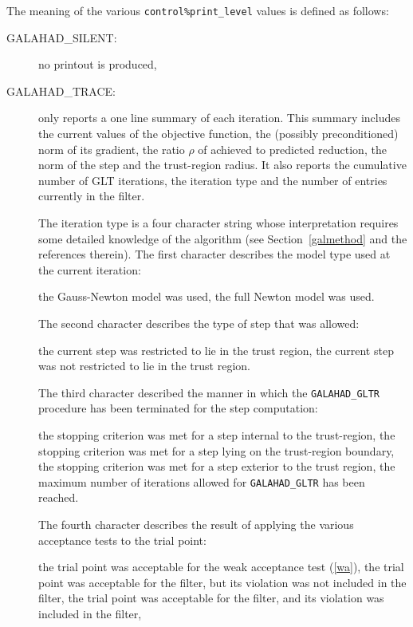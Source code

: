 \documentclass{galahad}
\newcommand{\sym}{\sf\small}
\begin{document}
\galinfo
The meaning of the various {\tt control\%print\_level} values is defined as
follows:
\begin{description}
\item[\sym GALAHAD\_SILENT:] no printout is produced,
\item[\sym GALAHAD\_TRACE:] only reports a one line summary of each iteration.
     This summary includes the current values of the objective function,
the (possibly preconditioned) norm of its gradient, the ratio $\rho$ of
achieved to predicted reduction, the norm of the step and the trust-region
radius. It also reports the cumulative number of GLT iterations, the iteration
type and the number of entries currently in the filter.

\noindent
The iteration type is a four character string whose interpretation requires
some detailed knowledge of the algorithm (see Section~\ref{galmethod} and the
references therein).
The first character describes the model type used at the current
iteration:
\begin{description}
 the Gauss-Newton model was used,
 the full Newton model was used.
\end{description}
The second character describes the type of step that was allowed:
\begin{description}
 the current step was restricted to lie in the trust region,
 the current step was not restricted to lie in the trust region.
\end{description}
The third character described the manner in which the {\tt GALAHAD\_GLTR}
procedure has been terminated for the step computation:
\begin{description}
 the stopping criterion was met for a step internal to the
trust-region,
 the stopping criterion was met for a step lying on the trust-region
boundary,
 the stopping criterion was met for a step exterior to the trust
region,
 the maximum number of iterations allowed for {\tt GALAHAD\_GLTR} has
been reached.
\end{description}
The fourth character describes the result of applying the various acceptance
tests to the trial point:
\begin{description}
 the trial point was acceptable for the weak acceptance test
(\ref{wa}),
 the trial point was acceptable for the filter, but its violation
was not included in the filter,
 the trial point was acceptable for the filter, and its violation
was included in the filter,

\end{description}
\end{description}
\end{document}
